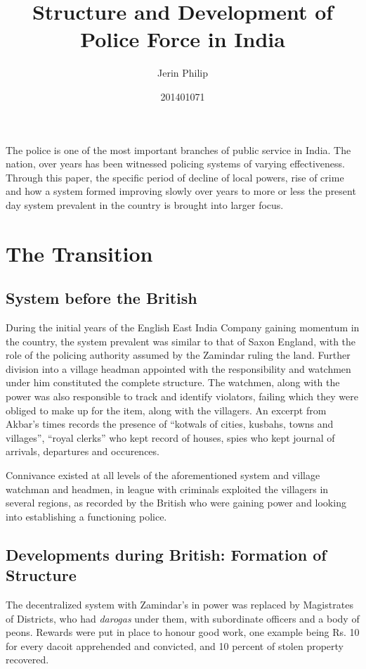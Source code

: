 \documentclass[a4paper]{article}
\title{Structure and Development of Police Force in India}
\author{Jerin Philip}
\date{201401071}
\begin{document}
\maketitle
The police is one of the most important branches of public
service in India. The nation, over years has been witnessed
policing systems of varying effectiveness.  Through this paper,
the specific period of decline of local powers, rise of crime
and how a system formed improving slowly over years to more or
less the present day system prevalent in the country is brought
into larger focus. 

\section*{The Transition}

\subsection*{System before the British}
During the initial years of the English East India Company
gaining momentum in the country, the system prevalent was
similar to that of Saxon England\cite[p. 5]{india1913history},
with the role of the policing authority assumed by the Zamindar
ruling the land. Further division into a village headman
appointed with the responsibility and watchmen under him
constituted the complete structure. The watchmen, along with the
power was also responsible to track and identify violators,
failing which they were obliged to make up for the item, along
with the villagers\cite[p. 5]{india1913history}. 
An excerpt from Akbar's times\cite[p. 6]{india1913history}
records the presence of ``kotwals of cities, kusbahs, towns and
villages'', ``royal clerks'' who kept record of houses, spies
who kept journal of arrivals, departures and occurences.

Connivance existed at all levels of the aforementioned system
and village watchman and headmen, in league with criminals
exploited the villagers in several regions, as recorded by the
British who were gaining power and looking into establishing a
functioning police. 
\subsection*{Developments during British: Formation of Structure}
The decentralized system with Zamindar's in
power was replaced by\cite[p. 8]{india1913history} Magistrates
of Districts, who had \emph{darogas} under them, with
subordinate officers and a body of peons. Rewards were put in
place to honour good work, one example being Rs. 10 for every
dacoit apprehended and convicted, and 10 percent of stolen
property recovered.
\end{document}
